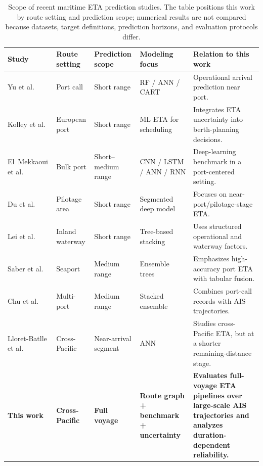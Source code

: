 \documentclass[sigconf,anonymous]{acmart}%
\begin{document}
\begin{table}[t]
    \centering
    \caption{Scope of recent maritime ETA prediction studies. The table positions this work by route setting and prediction scope; numerical results are not compared because datasets, target definitions, prediction horizons, and evaluation protocols differ.}
    \label{tab:lit_comparison}
    \footnotesize
    \setlength{\tabcolsep}{3pt}
    \renewcommand{\arraystretch}{1.08}
    \begin{tabular}{P{2.5cm} P{2.0cm} P{2.0cm} P{2.7cm} P{5.0cm}}
        \toprule
        \textbf{Study} & \textbf{Route setting} & \textbf{Prediction scope} & \textbf{Modeling focus} & \textbf{Relation to this work} \\
        \midrule
        Yu et al.~\cite{yuShipArrivalPrediction2018} & Port call & Short range & RF / ANN / CART & Operational arrival prediction near port. \\
        Kolley et al.~\cite{kolleyRobustBerthScheduling2022} & European port & Short range & ML ETA for scheduling & Integrates ETA uncertainty into berth-planning decisions. \\
        El~Mekkaoui et al.~\cite{elmekkaouiDeepLearningModels2022} & Bulk port & Short--medium range & CNN / LSTM / ANN / RNN & Deep-learning benchmark in a port-centered setting. \\
        Du et al.~\cite{duSegmentedETAPrediction2025} & Pilotage area & Short range & Segmented deep model & Focuses on near-port/pilotage-stage ETA. \\
        Lei et al.~\cite{leiPredictingVesselArrival2024} & Inland waterway & Short range & Tree-based stacking & Uses structured operational and waterway factors. \\
        Saber et al.~\cite{saberHighaccuracyPredictionVessels2025} & Seaport & Medium range & Ensemble trees & Emphasizes high-accuracy port ETA with tabular fusion. \\
        Chu et al.~\cite{chuVesselArrivalTime2025} & Multi-port & Medium range & Stacked ensemble & Combines port-call records with AIS trajectories. \\
        Lloret-Batlle et al.~\cite{lloretbatlle2025} & Cross-Pacific & Near-arrival segment & ANN & Studies cross-Pacific ETA, but at a shorter remaining-distance stage. \\
        \midrule
        \textbf{This work} & \textbf{Cross-Pacific} & \textbf{Full voyage} & \textbf{Route graph + benchmark + uncertainty} & \textbf{Evaluates full-voyage ETA pipelines over large-scale AIS trajectories and analyzes duration-dependent reliability.} \\
        \bottomrule
    \end{tabular}
\end{table}
\end{document}
